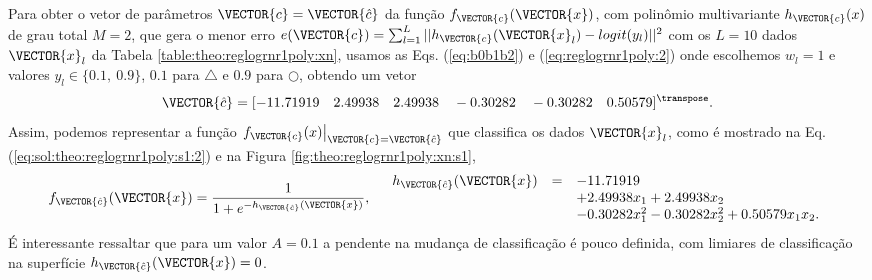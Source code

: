 \begin{SolutionT}\label{sol:theo:reglogrnr1poly:s1}
Para obter o vetor de parâmetros $\VECTOR{c}=\VECTOR{\hat{c}}$ da função $f_{\VECTOR{c}}(\VECTOR{x})$, 
com polinômio multivariante $h_{\VECTOR{c}}(x)$ de grau total $M=2$,
que gera o menor erro $e(\VECTOR{c}) =  \sum_{l=1}^{L} ||h_{\VECTOR{c}}(\VECTOR{x}_l)-logit(y_l)||^2$
com os $L=10$ dados $\VECTOR{x}_l$ da Tabela \ref{table:theo:reglogrnr1poly:xn},
usamos as Eqs. (\ref{eq:b0b1b2}) e  (\ref{eq:reglogrnr1poly:2}) onde escolhemos $w_l=1$ e valores $y_l \in \{0.1,~ 0.9\}$,
$0.1$ para $\bigtriangleup$ e $0.9$ para $\bigcirc$, 
obtendo um vetor 
\begin{equation}
\VECTOR{\hat{c}}=[-11.71919\quad 2.49938\quad 2.49938\quad -0.30282\quad -0.30282\quad 0.50579]^{\transpose}.
\end{equation}
Assim, podemos representar a função $\left.f_{\VECTOR{c}}(x)\right|_{\VECTOR{c}=\VECTOR{\hat{c}}}$ 
que classifica os dados $\VECTOR{x}_l$, 
como é mostrado na Eq. (\ref{eq:sol:theo:reglogrnr1poly:s1:2}) e na Figura \ref{fig:theo:reglogrnr1poly:xn:s1},
\begin{equation}\label{eq:sol:theo:reglogrnr1poly:s1:2}
f_{\VECTOR{\hat{c}}}(\VECTOR{x})= \frac{1}{1+e^{-h_{\VECTOR{\hat{c}}}(\VECTOR{x})}},
\quad
\begin{array}{lll}
h_{\VECTOR{\hat{c}}}(\VECTOR{x}) & = & -11.71919\\
                         ~ & ~ & +2.49938 x_1 +2.49938 x_2 \\
                         ~ & ~ & -0.30282 x_1^2 -0.30282  x_2^2 + 0.50579 x_1 x_2.\\
\end{array}
\end{equation}
É interessante ressaltar que para um valor $A=0.1$ a pendente na mudança de classificação é pouco definida,
com limiares de classificação na superfície $h_{\VECTOR{\hat{c}}}(\VECTOR{x})=0$.
\end{SolutionT}

